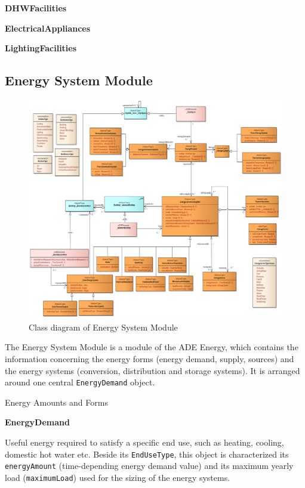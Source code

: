 \documentclass[a4paper,12pt]{article}
\begin{document}
\textbf{DHWFacilities}

\textbf{ElectricalAppliances}

\textbf{LightingFacilities}

\subsection{Energy System Module}\label{energy-system-module}

\begin{figure}[htbp]
\centering
\includegraphics{fig/class_EnergySystem.png}
\caption{Class diagram of Energy System Module}
\end{figure}

The Energy System Module is a module of the ADE Energy, which contains
the information concerning the energy forms (energy demand, supply,
sources) and the energy systems (conversion, distribution and storage
systems). It is arranged around one central \texttt{EnergyDemand}
object.

Energy Amounts and Forms

\textbf{EnergyDemand}

Useful energy required to satisfy a specific end use, such as heating,
cooling, domestic hot water etc. Beside its \texttt{EndUseType}, this
object is characterized its \texttt{energyAmount} (time-depending energy
demand value) and its maximum yearly load (\texttt{maximumLoad}) used
for the sizing of the energy systems.
\end{document}
